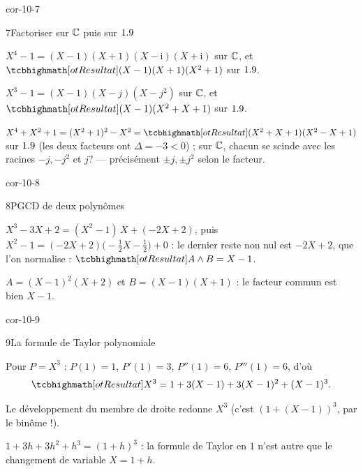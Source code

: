 \begin{blocLivre}{cor-10-7}
\begin{corrige}{7}{Factoriser sur $\mathbb{C}$ puis sur $1.9$}
\begin{questions}
  \item $X^{4}-1=(X-1)(X+1)(X-\mathrm{i})(X+\mathrm{i})$ sur $\mathbb{C}$, et
    $\res{(X-1)(X+1)(X^{2}+1)}$ sur $1.9$.
  \item $X^{3}-1=(X-1)(X-j)(X-j^{2})$ sur $\mathbb{C}$, et
    $\res{(X-1)(X^{2}+X+1)}$ sur $1.9$.
  \item $X^{4}+X^{2}+1=(X^{2}+1)^{2}-X^{2}
    =\res{(X^{2}+X+1)(X^{2}-X+1)}$ sur $1.9$ (les deux facteurs ont
    $\Delta=-3<0$) ; sur $\mathbb{C}$, chacun se scinde avec les racines
    $-j,-j^{2}$ et $j? $ — précisément $\pm j,\pm j^{2}$ selon le facteur.
\end{questions}
\end{corrige}
\end{blocLivre}

\begin{blocLivre}{cor-10-8}
\begin{corrige}{8}{PGCD de deux polynômes}
\begin{questions}
  \item $X^{3}-3X+2=(X^{2}-1)\,X+(-2X+2)$, puis
    $X^{2}-1=(-2X+2)\bigl(-\tfrac12X-\tfrac12\bigr)+0$ : le dernier reste
    non nul est $-2X+2$, que l'on normalise :
    $\res{A\wedge B=X-1}$.
  \item $A=(X-1)^{2}(X+2)$ et $B=(X-1)(X+1)$ : le facteur commun est
    bien $X-1$.
\end{questions}
\end{corrige}
\end{blocLivre}

\begin{blocLivre}{cor-10-9}
\begin{corrige}{9}{La formule de Taylor polynomiale}
\begin{questions}
  \item Pour $P=X^{3}$ : $P(1)=1$, $P'(1)=3$, $P''(1)=6$, $P'''(1)=6$,
    d'où
    \[
      \res{X^{3}=1+3(X-1)+3(X-1)^{2}+(X-1)^{3}}.
    \]
  \item Le développement du membre de droite redonne $X^{3}$
    (c'est $(1+(X-1))^{3}$, par le binôme !).
  \item $1+3h+3h^{2}+h^{3}=(1+h)^{3}$ : la formule de Taylor en $1$
    n'est autre que le changement de variable $X=1+h$.
\end{questions}
\end{corrige}
\end{blocLivre}

